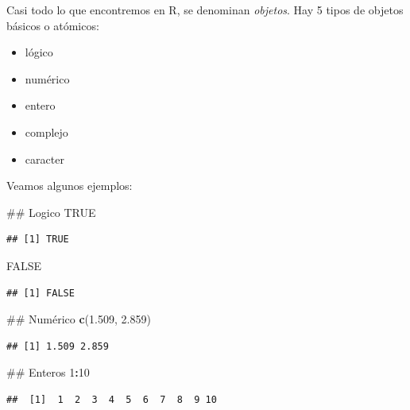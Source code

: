 \documentclass[spanish,]{book}
\newenvironment{Shaded}{\begin{snugshade}}{\end{snugshade}}
\newcommand{\KeywordTok}[1]{\textcolor[rgb]{0.13,0.29,0.53}{\textbf{#1}}}
\newcommand{\DecValTok}[1]{\textcolor[rgb]{0.00,0.00,0.81}{#1}}
\newcommand{\FloatTok}[1]{\textcolor[rgb]{0.00,0.00,0.81}{#1}}
\newcommand{\OtherTok}[1]{\textcolor[rgb]{0.56,0.35,0.01}{#1}}
\newcommand{\OperatorTok}[1]{\textcolor[rgb]{0.81,0.36,0.00}{\textbf{#1}}}
\newcommand{\NormalTok}[1]{#1}
\providecommand{\tightlist}{%
  \setlength{\itemsep}{0pt}\setlength{\parskip}{0pt}}
\begin{document}
Casi todo lo que encontremos en R, se denominan \emph{objetos}. Hay 5
tipos de objetos básicos o atómicos:

\begin{itemize}
\tightlist
\item
  lógico
\item
  numérico
\item
  entero
\item
  complejo
\item
  caracter
\end{itemize}

Veamos algunos ejemplos:

\begin{Shaded}
\begin{Highlighting}[]
\NormalTok{## Logico}
\OtherTok{TRUE}
\end{Highlighting}
\end{Shaded}

\begin{verbatim}
## [1] TRUE
\end{verbatim}

\begin{Shaded}
\begin{Highlighting}[]
\OtherTok{FALSE}
\end{Highlighting}
\end{Shaded}

\begin{verbatim}
## [1] FALSE
\end{verbatim}

\begin{Shaded}
\begin{Highlighting}[]
\NormalTok{## Numérico}
\KeywordTok{c}\NormalTok{(}\FloatTok{1.509}\NormalTok{, }\FloatTok{2.859}\NormalTok{)}
\end{Highlighting}
\end{Shaded}

\begin{verbatim}
## [1] 1.509 2.859
\end{verbatim}

\begin{Shaded}
\begin{Highlighting}[]
\NormalTok{## Enteros}
\DecValTok{1}\OperatorTok{:}\DecValTok{10}
\end{Highlighting}
\end{Shaded}

\begin{verbatim}
##  [1]  1  2  3  4  5  6  7  8  9 10
\end{verbatim}
\end{document}

